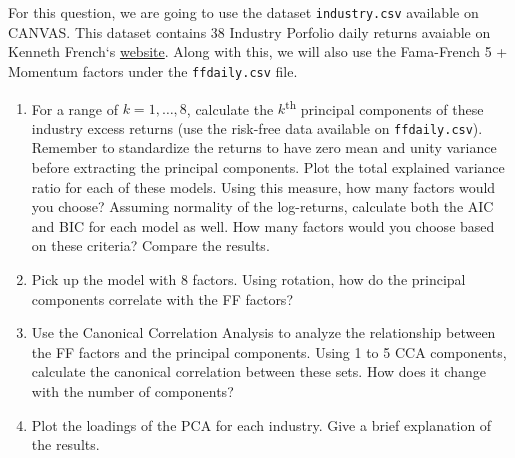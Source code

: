 For this question, we are going to use the dataset \texttt{industry.csv} available on CANVAS. This dataset contains 38 Industry Porfolio daily returns avaiable on Kenneth French`s \href{http://mba.tuck.dartmouth.edu/pages/faculty/ken.french/data_library.html}{website}. Along with this, we will also use the Fama-French 5 + Momentum factors under the \texttt{ffdaily.csv} file.

\begin{enumerate}[label = \Alph*)]
    \item For a range of \(k = 1, \dots, 8\), calculate the \(k\)\textsuperscript{th} principal components of these industry excess returns (use the risk-free data available on \texttt{ffdaily.csv}). Remember to standardize the returns to have zero mean and unity variance before extracting the principal components. Plot the total explained variance ratio for each of these models. Using this measure, how many factors would you choose? Assuming normality of the log-returns, calculate both the AIC and BIC for each model as well. How many factors would you choose based on these criteria? Compare the results.
    \item Pick up the model with 8 factors. Using rotation, how do the principal components correlate with the FF factors? 
    \item Use the Canonical Correlation Analysis to analyze the relationship between the FF factors and the principal components. Using 1 to 5 CCA components, calculate the canonical correlation between these sets. How does it change with the number of components?
    \item Plot the loadings of the PCA for each industry. Give a brief explanation of the results. 
\end{enumerate}